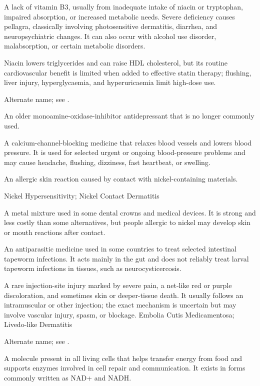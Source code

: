  A lack of vitamin B3, usually from inadequate intake of niacin or tryptophan, impaired absorption, or increased metabolic needs. Severe deficiency causes pellagra, classically involving photosensitive dermatitis, diarrhea, and neuropsychiatric changes. It can also occur with alcohol use disorder, malabsorption, or certain metabolic disorders.

 Niacin lowers triglycerides and can raise HDL cholesterol, but its routine cardiovascular benefit is limited when added to effective statin therapy; flushing, liver injury, hyperglycaemia, and hyperuricaemia limit high-dose use.

 Alternate name; see .

 An older monoamine-oxidase-inhibitor antidepressant that is no longer commonly used.

 A calcium-channel-blocking medicine that relaxes blood vessels and lowers blood pressure. It is used for selected urgent or ongoing blood-pressure problems and may cause headache, flushing, dizziness, fast heartbeat, or swelling.

 An allergic skin reaction caused by contact with nickel-containing materials.

\synonyms
Nickel Hypersensitivity; Nickel Contact Dermatitis

 A metal mixture used in some dental crowns and medical devices. It is strong and less costly than some alternatives, but people allergic to nickel may develop skin or mouth reactions after contact.

 An antiparasitic medicine used in some countries to treat selected intestinal tapeworm infections. It acts mainly in the gut and does not reliably treat larval tapeworm infections in tissues, such as neurocysticercosis.

 A rare injection-site injury marked by severe pain, a net-like red or purple discoloration, and sometimes skin or deeper-tissue death. It usually follows an intramuscular or other injection; the exact mechanism is uncertain but may involve vascular injury, spasm, or blockage.
\synonyms
Embolia Cutis Medicamentosa; Livedo-like Dermatitis

 Alternate name; see .

 A molecule present in all living cells that helps transfer energy from food and supports enzymes involved in cell repair and communication. It exists in forms commonly written as NAD+ and NADH.

